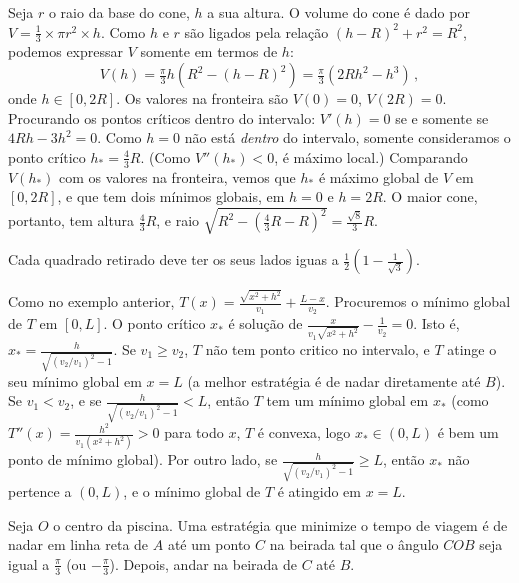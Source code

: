 \begin{Solution}{7.17}
Seja $r$ o raio da base do cone, $h$ a sua altura.
O volume do cone é dado por $V=\tfrac13 \times \pi r^2\times h$. Como $h$ e
$r$ são ligados pela relação $(h-R)^2+r^2=R^2$, podemos expressar $V$ somente
em termos de $h$:
$$V(h)=\tfrac{\pi}{3}h(R^2-(h-R)^2)=\tfrac{\pi}{3}(2Rh^2-h^3)\,,$$
onde $h\in [0,2R]$.
Os valores na fronteira são $V(0)=0$, $V(2R)=0$.
Procurando os pontos críticos dentro do intervalo: $V'(h)=0$ se e somente se
$4Rh-3h^2=0$. Como $h=0$ não está \emph{dentro} do intervalo, somente
consideramos o ponto crítico $h_*=\tfrac{4}{3}R$. (Como $V''(h_*)<0$, é máximo
local.) Comparando $V(h_*)$ com os valores na fronteira, vemos que $h_*$ é
máximo global de $V$ em $[0,2R]$, e que tem dois mínimos globais, em $h=0$ e
$h=2R$.
{O maior cone, portanto, tem altura $\tfrac{4}{3}R$, e raio
$\sqrt{R^2-(\tfrac{4}{3}R-R)^2}=\frac{\sqrt{8}}{3}R$.}
\end{Solution}
\begin{Solution}{7.19}
Cada quadrado retirado deve ter os seus lados iguas a
$\tfrac12(1-\frac{1}{\sqrt{3}})$.
\end{Solution}
\begin{Solution}{7.20}
Como no exemplo anterior, $T(x)=\frac{\sqrt{x^2+h^2}}{v_1}+\frac{L-x}{v_2}$.
Procuremos o mínimo global de $T$ em $[0,L]$.
O ponto crítico $x_*$ é solução de
$\frac{x}{v_1\sqrt{x^2+h^2}}-\frac{1}{v_2}=0$. Isto é,
$x_*=\frac{h}{\sqrt{(v_2/v_1)^2-1}}$.
Se $v_1\geq v_2$, $T$ não tem ponto critico no intervalo, e  $T$ atinge o seu
mínimo global em $x=L$ (a melhor estratégia é de nadar diretamente até $B$). Se
$v_1<v_2$, e se $\frac{h}{\sqrt{(v_2/v_1)^2-1}}<L$, então $T$ tem um mínimo
global em $x_*$ (como $T''(x)=\frac{h^2}{v_1(x^2+h^2)}>0$
para todo $x$, $T$ é convexa, logo $x_*\in (0,L)$ é bem um ponto de
mínimo global).
Por outro lado, se $\frac{h}{\sqrt{(v_2/v_1)^2-1}}\geq L$, então $x_*$ não
pertence a $(0,L)$, e o mínimo global de $T$ é atingido em $x=L$.
\end{Solution}
\begin{Solution}{7.21}
Seja $O$ o centro da piscina. Uma estratégia que minimize o tempo de
viagem é de nadar em linha
reta de $A$ até um ponto $C$ na beirada tal que o ângulo $COB$ seja igual a
$\frac{\pi}{3}$ (ou $-\frac{\pi}{3}$). Depois, andar na beirada de $C$
até $B$.
\end{Solution}
